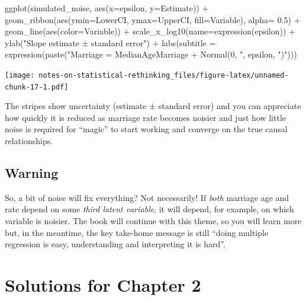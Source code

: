 \documentclass[
]{book}
\newenvironment{Shaded}{\begin{snugshade}}{\end{snugshade}}
\newcommand{\AttributeTok}[1]{\textcolor[rgb]{0.77,0.63,0.00}{#1}}
\newcommand{\FloatTok}[1]{\textcolor[rgb]{0.00,0.00,0.81}{#1}}
\newcommand{\FunctionTok}[1]{\textcolor[rgb]{0.00,0.00,0.00}{#1}}
\newcommand{\NormalTok}[1]{#1}
\newcommand{\SpecialCharTok}[1]{\textcolor[rgb]{0.00,0.00,0.00}{#1}}
\newcommand{\StringTok}[1]{\textcolor[rgb]{0.31,0.60,0.02}{#1}}
\begin{document}
\begin{Shaded}
\begin{Highlighting}[]
\FunctionTok{ggplot}\NormalTok{(simulated\_noise, }\FunctionTok{aes}\NormalTok{(}\AttributeTok{x=}\NormalTok{epsilon, }\AttributeTok{y=}\NormalTok{Estimate)) }\SpecialCharTok{+} 
  \FunctionTok{geom\_ribbon}\NormalTok{(}\FunctionTok{aes}\NormalTok{(}\AttributeTok{ymin=}\NormalTok{LowerCI, }\AttributeTok{ymax=}\NormalTok{UpperCI, }\AttributeTok{fill=}\NormalTok{Variable), }\AttributeTok{alpha=} \FloatTok{0.5}\NormalTok{) }\SpecialCharTok{+} 
  \FunctionTok{geom\_line}\NormalTok{(}\FunctionTok{aes}\NormalTok{(}\AttributeTok{color=}\NormalTok{Variable)) }\SpecialCharTok{+} 
  \FunctionTok{scale\_x\_log10}\NormalTok{(}\AttributeTok{name=}\FunctionTok{expression}\NormalTok{(epsilon)) }\SpecialCharTok{+} 
  \FunctionTok{ylab}\NormalTok{(}\StringTok{"Slope estimate  ± standard error"}\NormalTok{) }\SpecialCharTok{+}
  \FunctionTok{labs}\NormalTok{(}\AttributeTok{subtitle =} \FunctionTok{expression}\NormalTok{(}\FunctionTok{paste}\NormalTok{(}\StringTok{"Marriage = MedianAgeMarriage + Normal(0, "}\NormalTok{, epsilon, }\StringTok{")"}\NormalTok{)))}
\end{Highlighting}
\end{Shaded}

\texttt{[image: notes-on-statistical-rethinking\_files/figure-latex/unnamed-chunk-17-1.pdf]}

The stripes show uncertainty (estimate ± standard error) and you can appreciate how quickly it is reduced as marriage rate becomes noisier and just how little noise is required for ``magic'' to start working and converge on the true causal relationships.

\hypertarget{warning}{%
\section{Warning}\label{warning}}

So, a bit of noise will fix everything? Not necessarily! If \emph{both} marriage age and rate depend on some \emph{third latent variable}, it will depend, for example, on which variable is noisier. The book will continue with this theme, so you will learn more but, in the meantime, the key take-home message is still ``doing multiple regression is easy, understanding and interpreting it is hard''.

\hypertarget{solutions-for-chapter-2}{%
\chapter{Solutions for Chapter 2}\label{solutions-for-chapter-2}}
\end{document}
